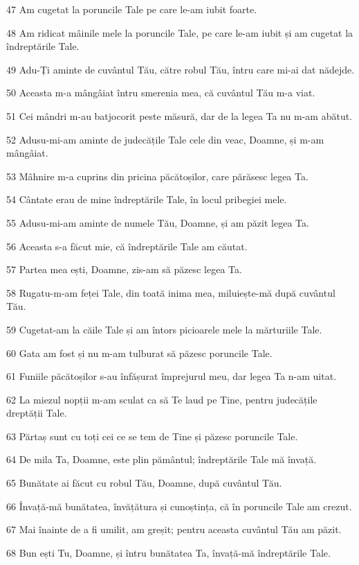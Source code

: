\par 47 Am cugetat la poruncile Tale pe care le-am iubit foarte.
\par 48 Am ridicat mâinile mele la poruncile Tale, pe care le-am iubit și am cugetat la îndreptările Tale.
\par 49 Adu-Ți aminte de cuvântul Tău, către robul Tău, întru care mi-ai dat nădejde.
\par 50 Aceasta m-a mângâiat întru smerenia mea, că cuvântul Tău m-a viat.
\par 51 Cei mândri m-au batjocorit peste măsură, dar de la legea Ta nu m-am abătut.
\par 52 Adusu-mi-am aminte de judecățile Tale cele din veac, Doamne, și m-am mângâiat.
\par 53 Mâhnire m-a cuprins din pricina păcătoșilor, care părăsesc legea Ta.
\par 54 Cântate erau de mine îndreptările Tale, în locul pribegiei mele.
\par 55 Adusu-mi-am aminte de numele Tău, Doamne, și am păzit legea Ta.
\par 56 Aceasta s-a făcut mie, că îndreptările Tale am căutat.
\par 57 Partea mea ești, Doamne, zis-am să păzesc legea Ta.
\par 58 Rugatu-m-am feței Tale, din toată inima mea, miluiește-mă după cuvântul Tău.
\par 59 Cugetat-am la căile Tale și am întors picioarele mele la mărturiile Tale.
\par 60 Gata am fost și nu m-am tulburat să păzesc poruncile Tale.
\par 61 Funiile păcătoșilor s-au înfășurat împrejurul meu, dar legea Ta n-am uitat.
\par 62 La miezul nopții m-am sculat ca să Te laud pe Tine, pentru judecățile dreptății Tale.
\par 63 Părtaș sunt cu toți cei ce se tem de Tine și păzesc poruncile Tale.
\par 64 De mila Ta, Doamne, este plin pământul; îndreptările Tale mă învață.
\par 65 Bunătate ai făcut cu robul Tău, Doamne, după cuvântul Tău.
\par 66 Învață-mă bunătatea, învățătura și cunoștința, că în poruncile Tale am crezut.
\par 67 Mai înainte de a fi umilit, am greșit; pentru aceasta cuvântul Tău am păzit.
\par 68 Bun ești Tu, Doamne, și întru bunătatea Ta, învață-mă îndreptările Tale.

